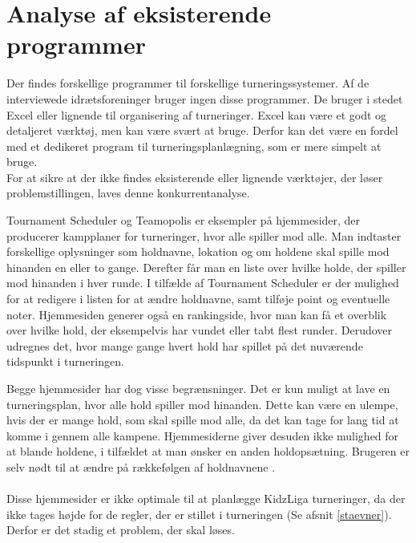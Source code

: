 \section{Analyse af eksisterende programmer}\label{eksisterendeProgrammer}
Der findes forskellige programmer til forskellige turneringssystemer. Af de interviewede idrætsforeninger bruger ingen disse programmer. De bruger i stedet Excel eller lignende til organisering af turneringer. Excel kan være et godt og detaljeret værktøj, men kan være svært at bruge. Derfor kan det være en fordel med et dedikeret program til turneringsplanlægning, som er mere simpelt at bruge.\\
For at sikre at der ikke findes eksisterende eller lignende værktøjer, der løser problemstillingen, laves denne konkurrentanalyse.
\par
Tournament Scheduler og Teamopolis er eksempler på hjemmesider, der producerer kampplaner for turneringer, hvor alle spiller mod alle. Man indtaster forskellige oplysninger som holdnavne, lokation og om holdene skal spille mod hinanden en eller to gange. Derefter får man en liste over hvilke holde, der spiller mod hinanden i hver runde. I tilfælde af Tournament Scheduler er der mulighed for at redigere i listen for at ændre holdnavne, samt tilføje point og eventuelle noter. Hjemmesiden generer også en rankingside, hvor man kan få et overblik over hvilke hold, der eksempelvis har vundet eller tabt flest runder. Derudover udregnes det, hvor mange gange hvert hold har spillet på det nuværende tidspunkt i turneringen.
\par
Begge hjemmesider har dog visse begrænsninger. Det er kun muligt at lave en turneringsplan, hvor alle hold spiller mod hinanden. Dette kan være en ulempe, hvis der er mange hold, som skal spille mod alle, da det kan tage for lang tid at komme i gennem alle kampene. Hjemmesiderne giver desuden ikke mulighed for at blande holdene, i tilfældet at man ønsker en anden holdopsætning. Brugeren er selv nødt til at ændre på rækkefølgen af holdnavnene \citep{Teamopolis}\citep{TournamentScheduler}.
\\\\
Disse hjemmesider er ikke optimale til at planlægge KidzLiga turneringer, da der ikke tages højde for de regler, der er stillet i turneringen (Se afsnit \ref{staevner}). Derfor er det stadig et problem, der skal løses. 


